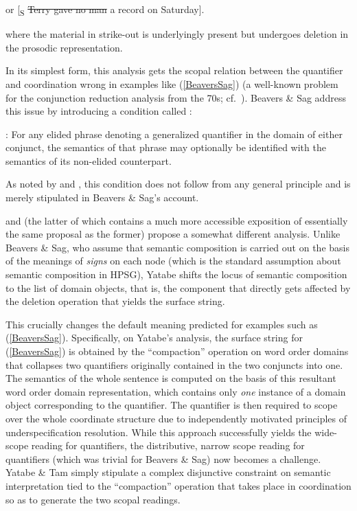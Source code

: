 \documentclass[output=paper
                ,modfonts
                ,nonflat
	        ,collection
	        ,collectionchapter
	        ,collectiontoclongg
 	        ,biblatex
                ,babelshorthands
                ,newtxmath
                ,draftmode
                ,colorlinks, citecolor=brown
]{./langsci/langscibook}
\begin{document}
\begin{exe}
 \ex\label{BeaversSag} or
  [\textsubscript{S} \sout{Terry gave no man} a record on Saturday]. 
\end{exe}
where the material in strike-out is underlyingly present but undergoes
deletion in the prosodic representation.

In its simplest form, this analysis gets the scopal relation between
the quantifier and coordination wrong in examples like (\ref{BeaversSag}) (a
well-known problem for the conjunction reduction analysis from the
70s; cf.\ \citealt{partee70}). 
Beavers \& Sag address this issue by introducing a condition called
:

\begin{exe}
 \ex\label{OQM}
  : For any elided phrase 
  denoting a generalized quantifier in the 
  domain of either conjunct, the semantics of that phrase may
  optionally be identified with the semantics of its non-elided
  counterpart.
\end{exe}
As noted by \citet{levine11} and \citet{kubota-levine-coord}, this condition
does not follow from any general principle and is merely stipulated in
Beavers \& Sag's account.

\citet{Yatabe2001a} and \citet{yatabe-tam2017} (the latter of which contains a
much more accessible exposition of essentially the same proposal as
the former) propose a somewhat different analysis. Unlike Beavers \& Sag, who
assume that semantic composition is carried out on the basis of the
meanings of \emph{signs} on each node (which is the standard assumption
about semantic composition in HPSG), Yatabe shifts the locus of
semantic composition to the list of domain objects, that is, the
component that directly gets affected by the deletion operation that
yields the surface string.

This crucially changes the default meaning predicted for examples such
as (\ref{BeaversSag}). Specifically, on Yatabe's analysis, the surface
string for (\ref{BeaversSag}) is obtained by the ``compaction''
operation on word order domains that collapses two quantifiers
originally contained in the two conjuncts into one. The semantics of
the whole sentence is computed on the basis of this resultant word
order domain representation, which contains only \emph{one} instance
of a domain object corresponding to the quantifier. The quantifier is
then required to scope over the whole coordinate structure due to
independently motivated principles of underspecification resolution.
While this approach successfully yields the wide-scope reading for
quantifiers, the distributive, narrow scope reading for quantifiers
(which was trivial for Beavers \& Sag) now becomes a challenge.
Yatabe \& Tam simply stipulate a complex disjunctive constraint on semantic
interpretation tied to the ``compaction'' operation that takes place in
coordination so as to generate the two scopal readings.
\end{document}
